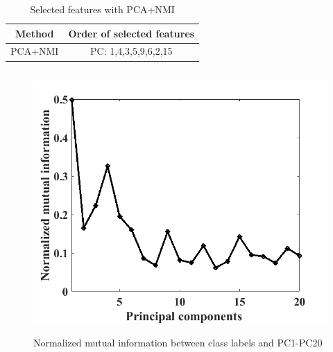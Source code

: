 \documentclass[document.tex]{subfiles}
\begin{document}
\begin{table}[H]
	\caption{Selected features with PCA+NMI}
	\begin{center}
		\begin{tabular}{|c|c|}
			\hline
			Method & Order of selected features\\ \hline
			PCA+NMI & PC: 1,4,3,5,9,6,2,15\\ \hline
		\end{tabular}
	\end{center}
	\label{tab:Selected features with PCA+NMI}
\end{table}

\begin{figure}[H]
	\begin{center}
		\includegraphics[height=10.0cm]{imgs/nmi.png}
	\end{center}
	\caption{Normalized mutual information between class labels and PC1-PC20}
	\label{fig:Normalized mutual information between class labels and PC1-PC20}
\end{figure}
\end{document}
